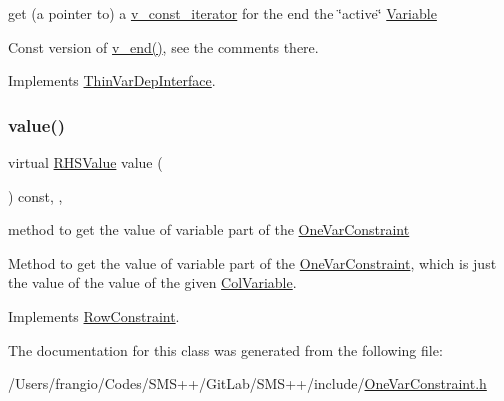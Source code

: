 get (a pointer to) a \mbox{\hyperlink{class_s_m_spp__di__unipi__it_1_1_one_var_constraint_1_1v__const__iterator}{v\+\_\+const\+\_\+iterator}} for the end the \char`\"{}active\char`\"{} \mbox{\hyperlink{class_s_m_spp__di__unipi__it_1_1_variable}{Variable}} 

Const version of \mbox{\hyperlink{class_s_m_spp__di__unipi__it_1_1_one_var_constraint_ad17303c6335cb94a9d32f1fce77501fd}{v\+\_\+end()}}, see the comments there. 

Implements \mbox{\hyperlink{group___thin_var_dep_interface___c_l_a_s_s_e_s_ga6c504e866663eb64b230179f81370af4}{Thin\+Var\+Dep\+Interface}}.

\mbox{\label{class_s_m_spp__di__unipi__it_1_1_one_var_constraint_ad9256be16b98f3b557f54fa5e2118db7}} 
\subsubsection{\texorpdfstring{value()}{value()}}
{\footnotesize\ttfamily virtual \mbox{\hyperlink{class_s_m_spp__di__unipi__it_1_1_row_constraint_a8813536ab3b13a81c8e83a999ade3bd8}{R\+H\+S\+Value}} value (\begin{DoxyParamCaption}\item[{void}]{ }\end{DoxyParamCaption}) const\hspace{0.3cm}{\ttfamily [inline]}, {\ttfamily [override]}, {\ttfamily [virtual]}}



method to get the value of variable part of the \mbox{\hyperlink{class_s_m_spp__di__unipi__it_1_1_one_var_constraint}{One\+Var\+Constraint}} 

Method to get the value of variable part of the \mbox{\hyperlink{class_s_m_spp__di__unipi__it_1_1_one_var_constraint}{One\+Var\+Constraint}}, which is just the value of the value of the given \mbox{\hyperlink{class_s_m_spp__di__unipi__it_1_1_col_variable}{Col\+Variable}}. 

Implements \mbox{\hyperlink{class_s_m_spp__di__unipi__it_1_1_row_constraint_a42562ba0a608bdc52a80a2bb512d0603}{Row\+Constraint}}.



The documentation for this class was generated from the following file\+:\begin{DoxyCompactItemize}
\item 
/\+Users/frangio/\+Codes/\+S\+M\+S++/\+Git\+Lab/\+S\+M\+S++/include/\mbox{\hyperlink{_one_var_constraint_8h}{One\+Var\+Constraint.\+h}}\end{DoxyCompactItemize}
